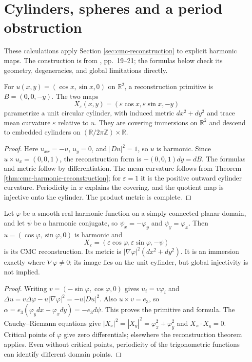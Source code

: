 \chapter{Cylinders, spheres and a period obstruction}\label{sec:examples-cmc-reconstruction}
These calculations apply Section \ref{sec:cmc-reconstruction} to explicit harmonic maps. The construction is from \cite{Hel01}, pp.~19--21; the formulas below check its geometry, degeneracies, and global limitations directly.

\begin{example}\label{ex:equatorial-harmonic-cylinder}
For $u(x,y)=(\cos x,\sin x,0)$ on $\mathbb R^2$, a reconstruction primitive is $B=(0,0,-y)$. The two maps
\[
 X_\varepsilon(x,y)=(\varepsilon\cos x,\varepsilon\sin x,-y)
\]
parametrize a unit circular cylinder, with induced metric $dx^2+dy^2$ and trace mean curvature $\varepsilon$ relative to $u$. They are covering immersions on $\mathbb R^2$ and descend to embedded cylinders on $(\mathbb R/2\pi\mathbb Z)\times\mathbb R$.
\end{example}
\begin{proof}
Here $u_{xx}=-u$, $u_y=0$, and $|Du|^2=1$, so $u$ is harmonic. Since $u\times u_x=(0,0,1)$, the reconstruction form is $-(0,0,1)dy=dB$. The formulas and metric follow by differentiation. The mean curvature follows from Theorem \ref{thm:cmc-harmonic-reconstruction}; for $\varepsilon=1$ it is the positive outward cylinder curvature. Periodicity in $x$ explains the covering, and the quotient map is injective onto the cylinder. The product metric is complete.
\end{proof}

\begin{example}\label{ex:harmonic-phase-cylinder}
Let $\varphi$ be a smooth real harmonic function on a simply connected planar domain, and let $\psi$ be a harmonic conjugate, so $\psi_x=-\varphi_y$ and $\psi_y=\varphi_x$. Then $u=(\cos\varphi,\sin\varphi,0)$ is harmonic and
\[
 X_\varepsilon=(\varepsilon\cos\varphi,\varepsilon\sin\varphi,-\psi)
\]
is its CMC reconstruction. Its metric is $|\nabla\varphi|^2(dx^2+dy^2)$. It is an immersion exactly where $\nabla\varphi\ne0$; its image lies on the unit cylinder, but global injectivity is not implied.
\end{example}
\begin{proof}
Writing $v=(-\sin\varphi,\cos\varphi,0)$ gives $u_i=v\varphi_i$ and $\Delta u=v\Delta\varphi-u|\nabla\varphi|^2=-u|Du|^2$. Also $u\times v=e_3$, so $\alpha=e_3(\varphi_y dx-\varphi_xdy)=-e_3d\psi$. This proves the primitive and formula. The Cauchy--Riemann equations give $|X_x|^2=|X_y|^2=\varphi_x^2+\varphi_y^2$ and $X_x\cdot X_y=0$. Critical points of $\varphi$ give zero differentials; elsewhere the reconstruction theorem applies. Even without critical points, periodicity of the trigonometric functions can identify different domain points.
\end{proof}

